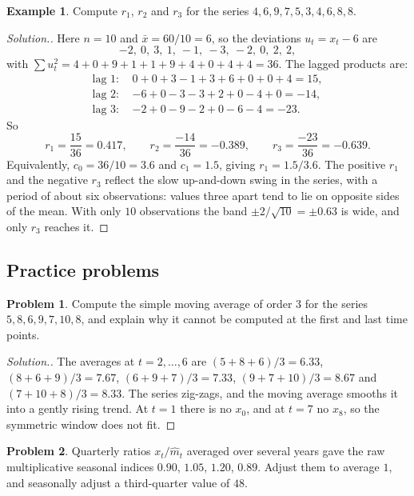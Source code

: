 \documentclass[11pt,a4paper]{article}
\theoremstyle{definition}
\newtheorem{exa}[thm]{Example}
\newtheorem{problemx}{Problem}[subsection]
\newenvironment{problem}{\begin{problemx}}{\end{problemx}}
\newenvironment{solution}
  {\renewcommand{\qedsymbol}{}\begin{proof}[\textit{Solution}.]}
  {\end{proof}}
\begin{document}
\begin{exa}\label{exa:sample-acf}
Compute $r_1$, $r_2$ and $r_3$ for the series $4, 6, 9, 7, 5, 3, 4, 6, 8, 8$.
\end{exa}

\begin{solution}
Here $n = 10$ and $\bar x = 60/10 = 6$, so the deviations $u_t = x_t - 6$ are
\[
-2, \ 0, \ 3, \ 1, \ -1, \ -3, \ -2, \ 0, \ 2, \ 2 ,
\]
with $\sum u_t^2 = 4 + 0 + 9 + 1 + 1 + 9 + 4 + 0 + 4 + 4 = 36$. The lagged products are:
\begin{align*}
\text{lag } 1: \ & 0 + 0 + 3 - 1 + 3 + 6 + 0 + 0 + 4 = 15 , \\
\text{lag } 2: \ & -6 + 0 - 3 - 3 + 2 + 0 - 4 + 0 = -14 , \\
\text{lag } 3: \ & -2 + 0 - 9 - 2 + 0 - 6 - 4 = -23 .
\end{align*}
So
\[
r_1 = \frac{15}{36} = 0.417 , \qquad r_2 = \frac{-14}{36} = -0.389 , \qquad r_3 = \frac{-23}{36} = -0.639 .
\]
Equivalently, $c_0 = 36/10 = 3.6$ and $c_1 = 1.5$, giving $r_1 = 1.5/3.6$. The positive $r_1$ and the negative $r_3$ reflect the slow
up-and-down swing in the series, with a period of about six observations: values three apart tend to lie on
opposite sides of the mean. With only $10$ observations the band $\pm2/\sqrt{10} = \pm0.63$ is wide, and only $r_3$ reaches it.
\end{solution}

\subsection{Practice problems}
\begin{problem}\label{prob:ts-ma3}
Compute the simple moving average of order $3$ for the series $5, 8, 6, 9, 7, 10, 8$, and explain why it cannot be
computed at the first and last time points.
\end{problem}

\begin{solution}
The averages at $t = 2, \dots, 6$ are $(5 + 8 + 6)/3 = 6.33$, $(8 + 6 + 9)/3 = 7.67$, $(6 + 9 + 7)/3 = 7.33$, $(9 + 7 + 10)/3 = 8.67$ and
$(7 + 10 + 8)/3 = 8.33$. The series zig-zags, and the moving average smooths it into a gently rising trend. At $t = 1$ there is
no $x_0$, and at $t = 7$ no $x_8$, so the symmetric window does not fit.
\end{solution}

\begin{problem}\label{prob:ts-multiplicative}
Quarterly ratios $x_t/\hat m_t$ averaged over several years gave the raw multiplicative seasonal indices $0.90$, $1.05$, $1.20$,
$0.89$. Adjust them to average $1$, and seasonally adjust a third-quarter value of $48$.
\end{problem}
\end{document}
